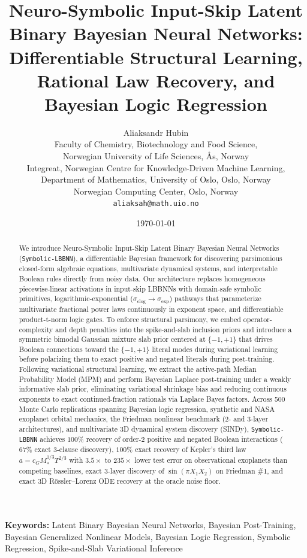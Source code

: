 \documentclass[11pt,a4paper]{article}
\title{\textbf{Neuro-Symbolic Input-Skip Latent Binary Bayesian Neural Networks:\\ Differentiable Structural Learning, Rational Law Recovery, and Bayesian Logic Regression}}
\author{
  Aliaksandr Hubin\\
  \small Faculty of Chemistry, Biotechnology and Food Science,\\
  \small Norwegian University of Life Sciences, {\AA}s, Norway\\
  \small Integreat, Norwegian Centre for Knowledge-Driven Machine Learning,\\
  \small Department of Mathematics, University of Oslo, Oslo, Norway\\
  \small Norwegian Computing Center, Oslo, Norway\\
  \small \texttt{aliaksah@math.uio.no}
}
\date{\today}
\begin{document}
\maketitle

\begin{abstract}
We introduce Neuro-Symbolic Input-Skip Latent Binary Bayesian Neural Networks (\texttt{Symbolic-LBBNN}), a differentiable Bayesian framework for discovering parsimonious closed-form algebraic equations, multivariate dynamical systems, and interpretable Boolean rules directly from noisy data. Our architecture replaces homogeneous piecewise-linear activations in input-skip LBBNNs with domain-safe symbolic primitives, logarithmic-exponential ($\sigma_{\text{clog}} \to \sigma_{\exp}$) pathways that parameterize multivariate fractional power laws continuously in exponent space, and differentiable product-t-norm logic gates. To enforce structural parsimony, we embed operator-complexity and depth penalties into the spike-and-slab inclusion priors and introduce a symmetric bimodal Gaussian mixture slab prior centered at $\{-1, +1\}$ that drives Boolean connections toward the $\{-1, +1\}$ literal modes during variational learning before polarizing them to exact positive and negated literals during post-training. Following variational structural learning, we extract the active-path Median Probability Model (MPM) and perform Bayesian Laplace post-training under a weakly informative slab prior, eliminating variational shrinkage bias and reducing continuous exponents to exact continued-fraction rationals via Laplace Bayes factors. Across 500 Monte Carlo replications spanning Bayesian logic regression, synthetic and NASA exoplanet orbital mechanics, the Friedman nonlinear benchmark (2- and 3-layer architectures), and multivariate 3D dynamical system discovery (SINDy), \texttt{Symbolic-LBBNN} achieves $100\%$ recovery of order-2 positive and negated Boolean interactions ($67\%$ exact 3-clause discovery), $100\%$ exact recovery of Kepler's third law $a = c_G M_*^{1/3}T^{2/3}$ with $3.5\times$ to $235\times$ lower test error on observational exoplanets than competing baselines, exact 3-layer discovery of $\sin(\pi X_1 X_2)$ on Friedman \#1, and exact 3D R\"ossler--Lorenz ODE recovery at the oracle noise floor.
\end{abstract}

\noindent\textbf{Keywords:} Latent Binary Bayesian Neural Networks, Bayesian Post-Training, Bayesian Generalized Nonlinear Models, Bayesian Logic Regression, Symbolic Regression, Spike-and-Slab Variational Inference
\end{document}
